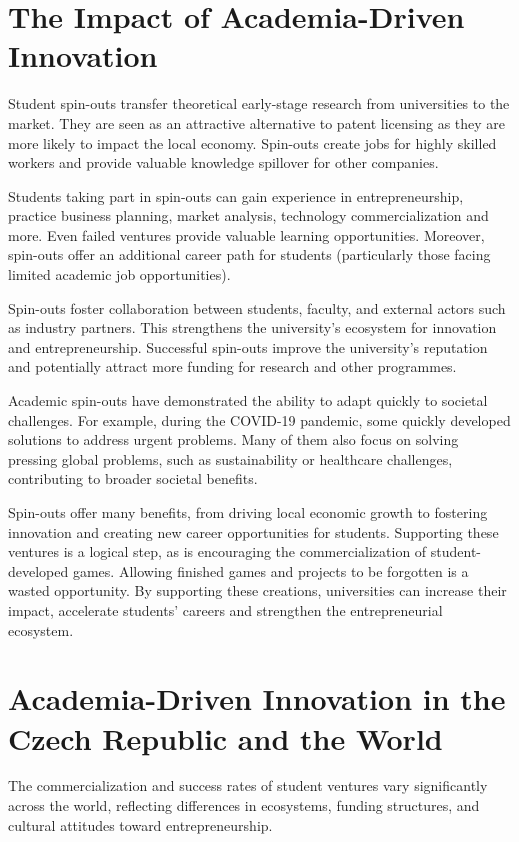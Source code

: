 \section{The Impact of Academia-Driven Innovation}
Student spin-outs transfer theoretical early-stage research from universities to the market. They are seen as an attractive alternative to patent licensing as they are more likely to impact the local economy. Spin-outs create jobs for highly skilled workers and provide valuable knowledge spillover for other companies.

Students taking part in spin-outs can gain experience in entrepreneurship, practice business planning, market analysis, technology commercialization and more. Even failed ventures provide valuable learning opportunities. Moreover, spin-outs offer an additional career path for students (particularly those facing limited academic job opportunities).

Spin-outs foster collaboration between students, faculty, and external actors such as industry partners. This strengthens the university's ecosystem for innovation and entrepreneurship. Successful spin-outs improve the university's reputation and potentially attract more funding for research and other programmes.

Academic spin-outs have demonstrated the ability to adapt quickly to societal challenges. For example, during the COVID-19 pandemic, some quickly developed solutions to address urgent problems. Many of them also focus on solving pressing global problems, such as sustainability or healthcare challenges, contributing to broader societal benefits.

Spin-outs offer many benefits, from driving local economic growth to fostering innovation and creating new career opportunities for students. Supporting these ventures is a logical step, as is encouraging the commercialization of student-developed games. Allowing finished games and projects to be forgotten is a wasted opportunity. By supporting these creations, universities can increase their impact, accelerate students' careers and strengthen the entrepreneurial ecosystem.

\section{Academia-Driven Innovation in the Czech Republic and the World}
The commercialization and success rates of student ventures vary significantly across the world, reflecting differences in ecosystems, funding structures, and cultural attitudes toward entrepreneurship.

